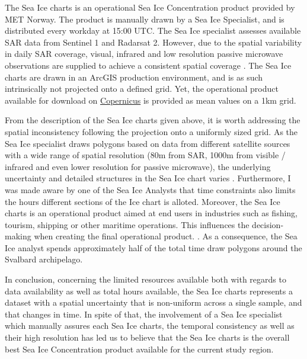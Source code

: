 \documentclass[../main/thesis.tex]{subfiles}
\begin{document}
\begin{figure}
\end{figure}

The Sea Ice charts is an operational Sea Ice Concentration product provided by MET Norway. The product is manually drawn by a Sea Ice Specialist, and is distributed every workday at 15:00 UTC. The Sea Ice specialist assesses available SAR data from Sentinel 1 and Radarsat 2. However, due to the spatial variability in daily SAR coverage, visual, infrared and low resolution passive microwave observations are supplied to achieve a consistent spatial coverage \cite{MOI2015}. The Sea Ice charts are drawn in an ArcGIS production environment, and is as such intrinsically not projected onto a defined grid. Yet, the operational product available for download on \href{https://resources.marine.copernicus.eu/product-detail/SEAICE_ARC_SEAICE_L4_NRT_OBSERVATIONS_011_002/INFORMATION}{Copernicus} is provided as mean values on a 1km grid.

From the description of the Sea Ice charts given above, it is worth addressing the spatial inconsistency following the projection onto a uniformly sized grid. As the Sea Ice specialist draws polygons based on data from different satellite sources with a wide range of spatial resolution (80m from SAR, 1000m from visible / infrared and even lower resolution for passive microwave), the underlying uncertainty and detailed structures in the Sea Ice chart varies \cite{MOI2015}. Furthermore, I was made aware by one of the Sea Ice Analysts that time constraints also limits the hours different sections of the Ice chart is alloted. Moreover, the Sea Ice charts is an operational product aimed at end users in industries such as fishing, tourism, shipping or other maritime operations. This influences the decision-making when creating the final operational product. . As a consequence, the Sea Ice analyst spends approximately half of the total time draw polygons around the Svalbard archipelago. 

In conclusion, concerning the limited resources available both with regards to data availability as well as total hours available, the Sea Ice charts represents a dataset with a spatial uncertainty that is non-uniform across a single sample, and that changes in time. In spite of that, the involvement of a Sea Ice specialist which manually assures each Sea Ice charts, the temporal consistency as well as their high resolution has led us to believe that the Sea Ice charts is the overall best Sea Ice Concentration product available for the current study region.
\end{document}

